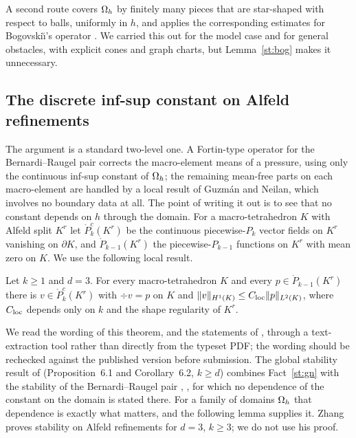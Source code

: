 \begin{remark}\label{st:rem:galdi}
A second route covers $\Omega_h$ by finitely many pieces that are star-shaped with respect to balls, uniformly in $h$, and applies the corresponding estimates for Bogovski\u{\i}'s operator \cite{Galdi,CostabelMcIntosh2010}. We carried this out for the model case and for general obstacles, with explicit cones and graph charts, but Lemma~\ref{st:bog} makes it unnecessary.
\end{remark}

\subsection{The discrete inf-sup constant on Alfeld refinements}
The argument is a standard two-level one. A Fortin-type operator for the Bernardi--Raugel pair corrects the macro-element means of a pressure, using only the continuous inf-sup constant of $\Omega_h$; the remaining mean-free parts on each macro-element are handled by a local result of Guzm\'an and Neilan, which involves no boundary data at all. The point of writing it out is to see that no constant depends on $h$ through the domain.
For a macro-tetrahedron $K$ with Alfeld split $K^r$ let $\mathring P^c_k(K^r)$ be the continuous piecewise-$P_k$ vector fields on $K^r$ vanishing on $\partial K$, and $\mathring P_{k-1}(K^r)$ the piecewise-$P_{k-1}$ functions on $K^r$ with mean zero on $K$. We use the following local result.

\begin{fact}\label{st:gn}
Let $k\ge1$ and $d=3$. For every macro-tetrahedron $K$ and every $p\in\mathring P_{k-1}(K^r)$ there is $v\in\mathring P^c_k(K^r)$ with $\div v=p$ on $K$ and $\lVert v\rVert_{H^1(K)}\le C_{\rm loc}\lVert p\rVert_{L^2(K)}$, where $C_{\rm loc}$ depends only on $k$ and the shape regularity of $K^r$.
\end{fact}

We read the wording of this theorem, and the statements of \cite[Proposition~4.1, Proposition~6.1, Corollary~6.2]{GuzmanNeilan2018}, through a text-extraction tool rather than directly from the typeset PDF; the wording should be rechecked against the published version before submission. %
The global stability result of \cite{GuzmanNeilan2018} (Proposition~6.1 and Corollary~6.2, $k\ge d$) combines Fact~\ref{st:gn} with the stability of the Bernardi--Raugel pair \cite[Proposition~4.1]{GuzmanNeilan2018}, \cite{BernardiRaugel1985}, for which no dependence of the constant on the domain is stated there. For a family of domains $\Omega_h$ that dependence is exactly what matters, and the following lemma supplies it. Zhang \cite{Zhang2005} proves stability on Alfeld refinements for $d=3$, $k\ge3$; we do not use his proof.

